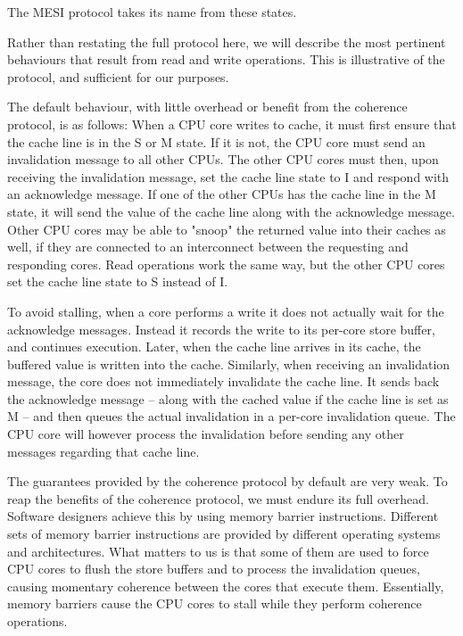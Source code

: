  The MESI protocol takes its name from these states.

Rather than restating the full protocol here, we will describe the most
pertinent behaviours that result from read and write operations. This is
illustrative of the protocol, and sufficient for our purposes.

The default behaviour, with little overhead or benefit from the coherence
protocol, is as follows: When a CPU core writes to cache, it must first ensure that
the cache line is in the S or M state. If it is not, the CPU core must send an
invalidation message to all other CPUs. The other CPU cores must then, upon
receiving the invalidation message, set the cache
line state to I and respond with an acknowledge message. If one of the other
CPUs has the cache line in the M state, it will send the value of the cache line
along with the acknowledge message. Other CPU cores may be able to "snoop" the
returned value into their caches as well, if they are connected to an
interconnect between the requesting and responding cores. Read operations work
the same way, but the other CPU cores set the cache line state to S instead of I.

To avoid stalling, when a core performs a write it does not actually wait
for the acknowledge messages. Instead it records the write to its per-core store
buffer, and continues execution. Later, when the cache line arrives in its
cache, the buffered value is written into the cache. Similarly, when receiving
an invalidation message, the core does not immediately invalidate the cache
line. It sends back the acknowledge message -- along with the cached value if the
cache line is set as M -- and then queues the actual invalidation in a per-core
invalidation queue. The
CPU core will however process the invalidation before sending any other messages
regarding that cache line\cite{mckenny-barriers}.

The guarantees provided by the coherence protocol by default are very weak.
To reap the benefits of the coherence protocol, we must endure its full
overhead. Software designers achieve this by using memory barrier
instructions. Different sets of memory barrier instructions are provided by
different operating systems and architectures. What matters to us is that some
of them are used to force CPU cores to flush the store buffers and to process the
invalidation queues, causing momentary coherence between the cores that execute
them. Essentially, memory barriers cause the CPU cores to stall while they perform
coherence operations.

